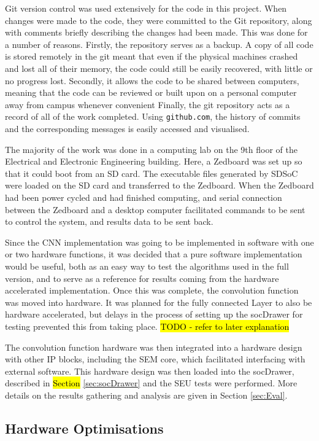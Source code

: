 \documentclass[12pt]{article}
\begin{document}
Git version control was used extensively for the code in this project. When changes were made to the code, they were committed to the Git repository, along with comments briefly describing the changes had been made. This was done for a number of reasons. Firstly, the repository serves as a backup. A copy of all code is stored remotely in the git meant that even if the physical machines crashed and lost all of their memory, the code could still be easily recovered, with little or no progress lost. Secondly, it allows the code to be shared between computers, meaning that the code can be reviewed or built upon on a personal computer away from campus whenever convenient Finally, the git repository acts as a record of all of the work completed. Using \lstinline|github.com|, the history of commits and the corresponding messages is easily accessed and visualised. 

The majority of the work was done in a computing lab on the 9th floor of the Electrical and Electronic Engineering building. Here, a Zedboard was set up so that it could boot from an SD card. The executable files generated by SDSoC were loaded on the SD card and transferred to the Zedboard. When the Zedboard had been power cycled and had finished computing, and serial connection between the Zedboard and a desktop computer facilitated commands to be sent to control the system, and results data to be sent back.

Since the CNN implementation was going to be implemented in software with one or two hardware functions, it was decided that a pure software implementation would be useful, both as an easy way to test the algorithms used in the full version, and to serve as a reference for results coming from the hardware accelerated implementation. Once this was complete, the convolution function was moved into hardware. It was planned for the fully connected Layer to also be hardware accelerated, but delays in the process of setting up the socDrawer for testing prevented this from taking place. \hl{TODO - refer to later explanation}

The convolution function hardware was then integrated into a hardware design with other IP blocks, including the SEM core, which facilitated interfacing with external software. This hardware design was then loaded into the socDrawer, described in \hl{Section} \ref{sec:socDrawer} and the SEU tests were performed. More details on the results gathering and analysis are given in Section \ref{sec:Eval}.

\subsection{Hardware Optimisations}
\label{sec:Imp-Optimisations}
\end{document}
